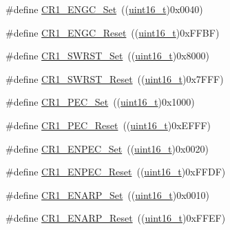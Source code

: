 \begin{DoxyCompactItemize}
\item 
\#define \hyperlink{group___i2_c___private___defines_gadcd99a681046a2315f4bc72c9f461f0e}{C\+R1\+\_\+\+E\+N\+G\+C\+\_\+\+Set}~((\hyperlink{_p_e___types_8h_a1f1825b69244eb3ad2c7165ddc99c956}{uint16\+\_\+t})0x0040)
\item 
\#define \hyperlink{group___i2_c___private___defines_gab51161052b055a5eecb0aad447a776e5}{C\+R1\+\_\+\+E\+N\+G\+C\+\_\+\+Reset}~((\hyperlink{_p_e___types_8h_a1f1825b69244eb3ad2c7165ddc99c956}{uint16\+\_\+t})0x\+F\+F\+B\+F)
\item 
\#define \hyperlink{group___i2_c___private___defines_ga0e067bb108052ea0e8e49feb194c2ca0}{C\+R1\+\_\+\+S\+W\+R\+S\+T\+\_\+\+Set}~((\hyperlink{_p_e___types_8h_a1f1825b69244eb3ad2c7165ddc99c956}{uint16\+\_\+t})0x8000)
\item 
\#define \hyperlink{group___i2_c___private___defines_gab41b615034ed8f830ef4900a0fcefc39}{C\+R1\+\_\+\+S\+W\+R\+S\+T\+\_\+\+Reset}~((\hyperlink{_p_e___types_8h_a1f1825b69244eb3ad2c7165ddc99c956}{uint16\+\_\+t})0x7\+F\+F\+F)
\item 
\#define \hyperlink{group___i2_c___private___defines_gad0ab853d291338d4cf3aee736353f0b8}{C\+R1\+\_\+\+P\+E\+C\+\_\+\+Set}~((\hyperlink{_p_e___types_8h_a1f1825b69244eb3ad2c7165ddc99c956}{uint16\+\_\+t})0x1000)
\item 
\#define \hyperlink{group___i2_c___private___defines_gabb6969dfa44c3539ef93f04f8136c3c7}{C\+R1\+\_\+\+P\+E\+C\+\_\+\+Reset}~((\hyperlink{_p_e___types_8h_a1f1825b69244eb3ad2c7165ddc99c956}{uint16\+\_\+t})0x\+E\+F\+F\+F)
\item 
\#define \hyperlink{group___i2_c___private___defines_ga7fdf69341e5debc3244812012ae332e6}{C\+R1\+\_\+\+E\+N\+P\+E\+C\+\_\+\+Set}~((\hyperlink{_p_e___types_8h_a1f1825b69244eb3ad2c7165ddc99c956}{uint16\+\_\+t})0x0020)
\item 
\#define \hyperlink{group___i2_c___private___defines_gabd33104d7b8e4673fa330f4ca3a97e44}{C\+R1\+\_\+\+E\+N\+P\+E\+C\+\_\+\+Reset}~((\hyperlink{_p_e___types_8h_a1f1825b69244eb3ad2c7165ddc99c956}{uint16\+\_\+t})0x\+F\+F\+D\+F)
\item 
\#define \hyperlink{group___i2_c___private___defines_ga73cfd7b486b4279fc6a83de64ab23985}{C\+R1\+\_\+\+E\+N\+A\+R\+P\+\_\+\+Set}~((\hyperlink{_p_e___types_8h_a1f1825b69244eb3ad2c7165ddc99c956}{uint16\+\_\+t})0x0010)
\item 
\#define \hyperlink{group___i2_c___private___defines_ga173b065ec9b7b33c0fa0bf71c0fa2207}{C\+R1\+\_\+\+E\+N\+A\+R\+P\+\_\+\+Reset}~((\hyperlink{_p_e___types_8h_a1f1825b69244eb3ad2c7165ddc99c956}{uint16\+\_\+t})0x\+F\+F\+E\+F)

\end{DoxyCompactItemize}
